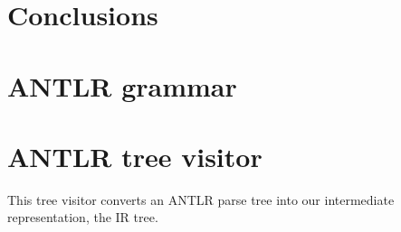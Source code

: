 \documentclass[a4paper]{article}
\begin{document}
\section{Conclusions}

\clearpage

\begin{appendices}

\section{ANTLR grammar}



\section{ANTLR tree visitor}

This tree visitor converts an ANTLR parse tree into our intermediate representation, the IR tree.



\end{appendices}
\end{document}
